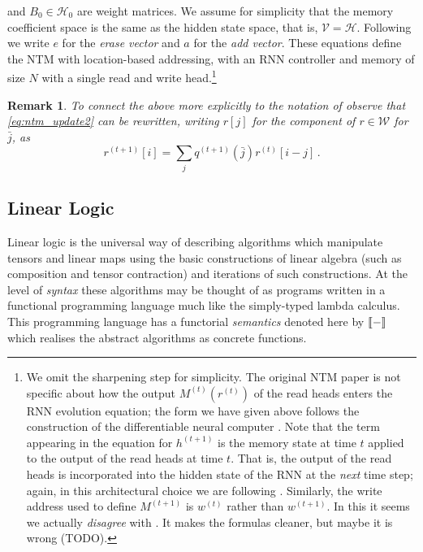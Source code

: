 \documentclass[english,letter paper,12pt,leqno]{article}
\theoremstyle{example}
\newtheorem{remark}[theorem]{Remark}
\numberwithin{equation}{section}
\def\be{\begin{equation}}
\def\ee{\end{equation}}
\begin{document}
and $B_0 \in \mathscr{H}_0$ are weight matrices. We assume for simplicity that the memory coefficient space is the same as the hidden state space, that is, $\mathscr{V} = \mathscr{H}$. Following \cite[\S 3.2]{ntm} we write $e$ for the \emph{erase vector} and $a$ for the \emph{add vector}. These equations define the NTM with location-based addressing, with an RNN controller and memory of size $N$ with a single read and write head.\footnote{We omit the sharpening step \cite[Eq. (9)]{ntm} for simplicity. The original NTM paper \cite{ntm} is not specific about how the output $M^{(t)}(r^{(t)})$ of the read heads enters the RNN evolution equation; the form we have given above follows the construction of the differentiable neural computer \cite[p. 7]{dnc}. Note that the term appearing in the equation for $h^{(t+1)}$ is the memory state at time $t$ applied to the output of the read heads at time $t$. That is, the output of the read heads is incorporated into the hidden state of the RNN at the \emph{next} time step; again, in this architectural choice we are following \cite{dnc}. Similarly, the write address used to define $M^{(t+1)}$ is $w^{(t)}$ rather than $w^{(t+1)}$. In this it seems we actually \emph{disagree} with \cite{ntm,dnc}. It makes the formulas cleaner, but maybe it is wrong (TODO). }

\begin{remark} To connect the above more explicitly to the notation of \cite[Eq. (8)]{ntm} observe that \eqref{eq:ntm_update2} can be rewritten, writing $r[j]$ for the component of $r \in \mathscr{W}$ for $\bar{j}$, as
\be\label{eq:moreexplicah}
r^{(t+1)}[i] = \sum_j q^{(t+1)}(\bar{j}) r^{(t)}[i-j]\,.
\ee
\end{remark}

\subsection{Linear Logic}

Linear logic is the universal way of describing algorithms which manipulate tensors and linear maps using the basic constructions of linear algebra (such as composition and tensor contraction) and iterations of such constructions. At the level of \emph{syntax} these algorithms may be thought of as programs written in a functional programming language much like the simply-typed lambda calculus. This programming language has a functorial \emph{semantics} denoted here by $\llbracket - \rrbracket$ which realises the abstract algorithms as concrete functions.
\end{document}
